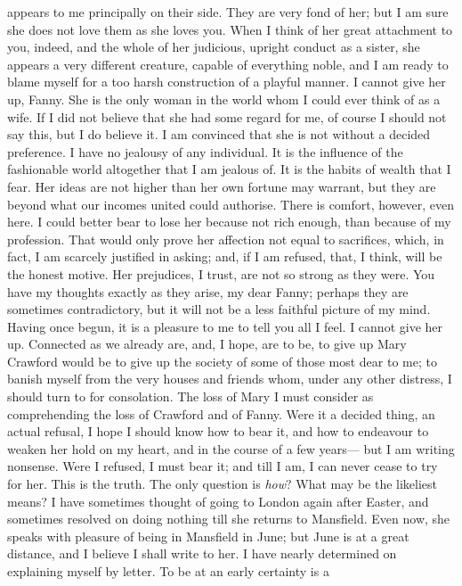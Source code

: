 \documentclass{article}
\begin{document}
appears to me principally on their side.  They are very
fond of her; but I am sure she does not love them as she
loves you.  When I think of her great attachment to you,
indeed, and the whole of her judicious, upright conduct
as a sister, she appears a very different creature,
capable of everything noble, and I am ready to blame
myself for a too harsh construction of a playful manner.
I cannot give her up, Fanny.  She is the only woman
in the world whom I could ever think of as a wife.
If I did not believe that she had some regard for me,
of course I should not say this, but I do believe it.
I am convinced that she is not without a decided preference.
I have no jealousy of any individual.  It is the influence
of the fashionable world altogether that I am jealous of.
It is the habits of wealth that I fear.  Her ideas are
not higher than her own fortune may warrant, but they
are beyond what our incomes united could authorise.
There is comfort, however, even here.  I could better
bear to lose her because not rich enough, than because
of my profession.  That would only prove her affection
not equal to sacrifices, which, in fact, I am scarcely
justified in asking; and, if I am refused, that, I think,
will be the honest motive.  Her prejudices, I trust,
are not so strong as they were.  You have my thoughts
exactly as they arise, my dear Fanny; perhaps they are
sometimes contradictory, but it will not be a less faithful
picture of my mind.  Having once begun, it is a pleasure
to me to tell you all I feel.  I cannot give her up.
Connected as we already are, and, I hope, are to be,
to give up Mary Crawford would be to give up the society
of some of those most dear to me; to banish myself from
the very houses and friends whom, under any other distress,
I should turn to for consolation.  The loss of Mary I must
consider as comprehending the loss of Crawford and of Fanny.
Were it a decided thing, an actual refusal, I hope I
should know how to bear it, and how to endeavour to weaken
her hold on my heart, and in the course of a few years---%
but I am writing nonsense.  Were I refused, I must bear it;
and till I am, I can never cease to try for her.
This is the truth.  The only question is \emph{how}?  What may
be the likeliest means?  I have sometimes thought of going
to London again after Easter, and sometimes resolved on
doing nothing till she returns to Mansfield.  Even now,
she speaks with pleasure of being in Mansfield in June;
but June is at a great distance, and I believe I shall
write to her.  I have nearly determined on explaining
myself by letter.  To be at an early certainty is a
\end{document}
